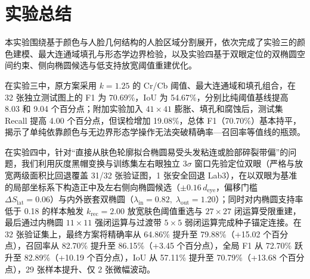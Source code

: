 \section{实验总结}

本实验围绕基于颜色与人脸几何结构的人脸区域分割展开，依次完成了实验三的颜色建模、最大连通域填孔与形态学边界检验，以及实验四基于双眼定位的双椭圆空间约束、侧向椭圆候选与低支持放宽阈值重建优化。

在实验三中，原方案采用 $k=1.25$ 的 Cr/Cb 阈值、最大连通域和填孔组合，在 32 张独立测试图上的 F1 为 70.69\%，IoU 为 54.67\%，分别比纯阈值基线提高 8.03 和 9.04 个百分点；附加实验加入 $41\times41$ 膨胀、填孔和腐蚀后，测试集 Recall 提高 4.00 个百分点，但误检增加 19.08\%，总体 F1（70.70\%）基本持平，揭示了单纯依靠颜色与无边界形态学操作无法突破精确率—召回率等值线的瓶颈。

在实验四中，针对“直接从肤色轮廓拟合椭圆易受头发粘连或脸部碎裂带偏”的问题，我们利用灰度黑帽变换与训练集左右眼独立 $3\sigma$ 窗口先验定位双眼（严格与放宽两级面积比回退覆盖 31/32 张验证图，1 张安全回退 Lab3），在以双眼为基准的局部坐标系下构造正中及左右侧向椭圆候选（$\pm 0.16\,d_{\text{eye}}$，偏移门槛 $\Delta S_{\text{lat}}=0.06$）与内外嵌套双椭圆（$\lambda_{\text{in}}=0.82,\;\lambda_{\text{out}}=1.20$）；同时对内椭圆支持率低于 0.18 的样本触发 $k_{\text{rec}}=2.00$ 放宽肤色阈值重选与 $27\times27$ 闭运算受限重建，最后通过内椭圆 $11\times11$ 强闭运算与过渡带 $5\times5$ 弱闭运算完成种子锚定连接。在 32 张验证集上，最终方案将精确率从 64.86\% 提升至 79.88\%（+15.02 个百分点），召回率从 82.70\% 提升至 86.15\%（+3.45 个百分点），全局 F1 从 72.70\% 跃升至 82.89\%（+10.19 个百分点），IoU 从 57.11\% 提升至 70.79\%（+13.68 个百分点），29 张样本提升、仅 2 张微幅波动。
